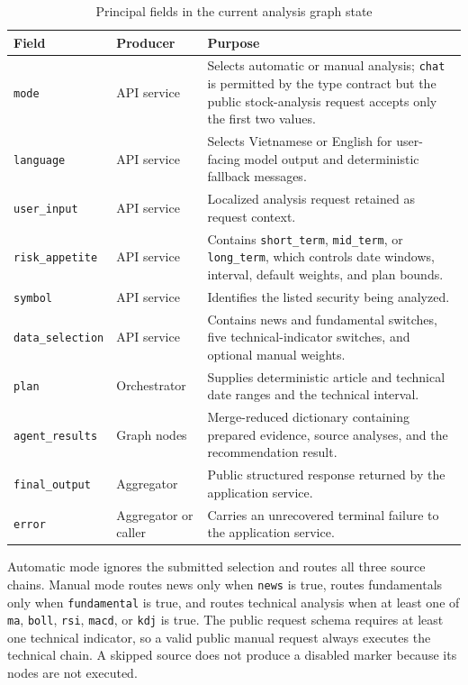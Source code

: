 \begin{table}[H]
    \centering
    \caption{Principal fields in the current analysis graph state}
    \label{tab:analysis-workflow-state}
    \small
    \setlength{\tabcolsep}{5pt}
    \renewcommand{\arraystretch}{1.18}
    \begin{tabular}{p{3.0cm} p{3.0cm} p{6.5cm}}
        \toprule
        \textbf{Field} & \textbf{Producer} & \textbf{Purpose} \\
        \midrule
        \texttt{mode} & API service & Selects automatic or manual analysis; \texttt{chat} is permitted by the type contract but the public stock-analysis request accepts only the first two values. \\
        \texttt{language} & API service & Selects Vietnamese or English for user-facing model output and deterministic fallback messages. \\
        \texttt{user\_input} & API service & Localized analysis request retained as request context. \\
        \texttt{risk\_appetite} & API service & Contains \texttt{short\_term}, \texttt{mid\_term}, or \texttt{long\_term}, which controls date windows, interval, default weights, and plan bounds. \\
        \texttt{symbol} & API service & Identifies the listed security being analyzed. \\
        \texttt{data\_selection} & API service & Contains news and fundamental switches, five technical-indicator switches, and optional manual weights. \\
        \texttt{plan} & Orchestrator & Supplies deterministic article and technical date ranges and the technical interval. \\
        \texttt{agent\_results} & Graph nodes & Merge-reduced dictionary containing prepared evidence, source analyses, and the recommendation result. \\
        \texttt{final\_output} & Aggregator & Public structured response returned by the application service. \\
        \texttt{error} & Aggregator or caller & Carries an unrecovered terminal failure to the application service. \\
        \bottomrule
    \end{tabular}
\end{table}

Automatic mode ignores the submitted selection and routes all three source chains. Manual mode routes news only when \texttt{news} is true, routes fundamentals only when \texttt{fundamental} is true, and routes technical analysis when at least one of \texttt{ma}, \texttt{boll}, \texttt{rsi}, \texttt{macd}, or \texttt{kdj} is true. The public request schema requires at least one technical indicator, so a valid public manual request always executes the technical chain. A skipped source does not produce a disabled marker because its nodes are not executed.

